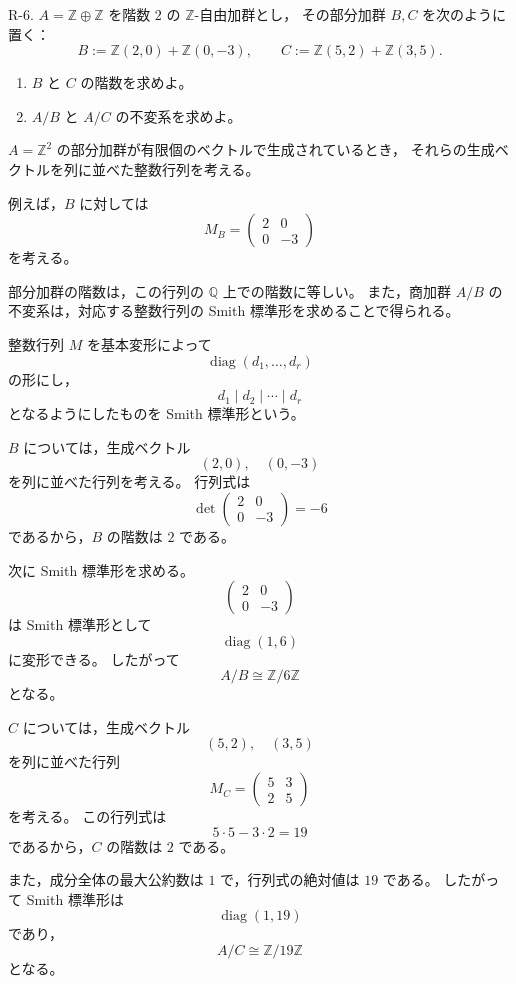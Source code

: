
\begin{exercise}
	R-6. $A=\mathbb{Z}\oplus\mathbb{Z}$ を階数 $2$ の $\mathbb{Z}$-自由加群とし，
	その部分加群 $B,C$ を次のように置く：
	\[
	B:=\mathbb{Z}(2,0)+\mathbb{Z}(0,-3),
	\qquad
	C:=\mathbb{Z}(5,2)+\mathbb{Z}(3,5).
	\]
	\begin{enumerate}
		\item $B$ と $C$ の階数を求めよ。
		\item $A/B$ と $A/C$ の不変系を求めよ。
	\end{enumerate}
\end{exercise}

\begin{background}
	$A=\mathbb{Z}^2$ の部分加群が有限個のベクトルで生成されているとき，
	それらの生成ベクトルを列に並べた整数行列を考える。
	
	例えば，$B$ に対しては
	\[
	M_B=
	\begin{pmatrix}
		2 & 0\\
		0 & -3
	\end{pmatrix}
	\]
	を考える。
	
	部分加群の階数は，この行列の $\mathbb{Q}$ 上での階数に等しい。
	また，商加群 $A/B$ の不変系は，対応する整数行列の
	Smith 標準形を求めることで得られる。
	
	整数行列 $M$ を基本変形によって
	\[
	\operatorname{diag}(d_1,\dots,d_r)
	\]
	の形にし，
	\[
	d_1\mid d_2\mid\cdots\mid d_r
	\]
	となるようにしたものを Smith 標準形という。
\end{background}

\begin{strategy}
	$B$ については，生成ベクトル
	\[
	(2,0),\quad (0,-3)
	\]
	を列に並べた行列を考える。
	行列式は
	\[
	\det
	\begin{pmatrix}
		2 & 0\\
		0 & -3
	\end{pmatrix}
	=-6
	\]
	であるから，$B$ の階数は $2$ である。
	
	次に Smith 標準形を求める。
	\[
	\begin{pmatrix}
		2 & 0\\
		0 & -3
	\end{pmatrix}
	\]
	は Smith 標準形として
	\[
	\operatorname{diag}(1,6)
	\]
	に変形できる。
	したがって
	\[
	A/B\cong \mathbb{Z}/6\mathbb{Z}
	\]
	となる。
	
	$C$ については，生成ベクトル
	\[
	(5,2),\quad (3,5)
	\]
	を列に並べた行列
	\[
	M_C=
	\begin{pmatrix}
		5 & 3\\
		2 & 5
	\end{pmatrix}
	\]
	を考える。
	この行列式は
	\[
	5\cdot 5-3\cdot 2=19
	\]
	であるから，$C$ の階数は $2$ である。
	
	また，成分全体の最大公約数は $1$ で，行列式の絶対値は $19$ である。
	したがって Smith 標準形は
	\[
	\operatorname{diag}(1,19)
	\]
	であり，
	\[
	A/C\cong \mathbb{Z}/19\mathbb{Z}
	\]
	となる。
\end{strategy}